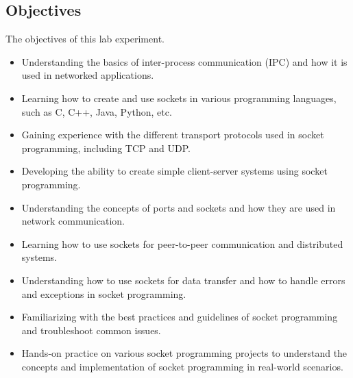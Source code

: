 \documentclass[11pt]{article}
\begin{document}
\subsection{Objectives}
The objectives of this lab experiment.
\begin{itemize}
    \item Understanding the basics of inter-process communication (IPC) and how it is used in networked applications.

    \item Learning how to create and use sockets in various programming languages, such as C, C++, Java, Python, etc.

    \item Gaining experience with the different transport protocols used in socket programming, including TCP and UDP.

    \item Developing the ability to create simple client-server systems using socket programming.

    \item Understanding the concepts of ports and sockets and how they are used in network communication.

    \item Learning how to use sockets for peer-to-peer communication and distributed systems.

    \item Understanding how to use sockets for data transfer and how to handle errors and exceptions in socket programming.

    \item Familiarizing with the best practices and guidelines of socket programming and troubleshoot common issues.

    \item Hands-on practice on various socket programming projects to understand the concepts and implementation of socket programming in real-world scenarios.
\end{itemize}
\end{document}
